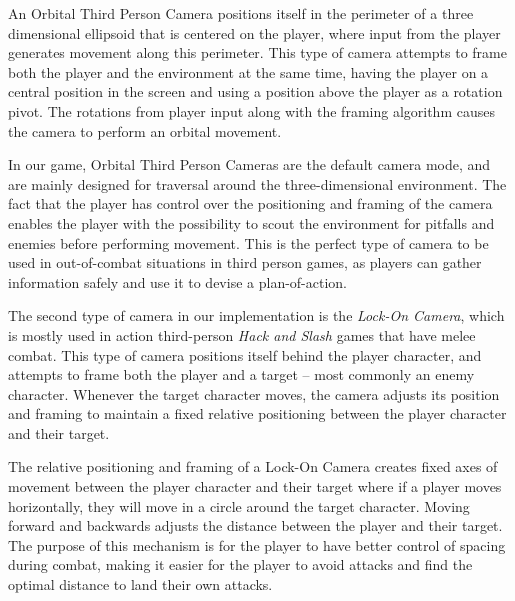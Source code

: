 An Orbital Third Person Camera positions itself in the perimeter of a three dimensional ellipsoid that is centered on the player, where input from the player generates movement along this perimeter. This type of camera attempts to frame both the player and the environment at the same time, having the player on a central position in the screen and using a position above the player as a rotation pivot. The rotations from player input along with the framing algorithm causes the camera to perform an orbital movement.

In our game, Orbital Third Person Cameras are the default camera mode, and are mainly designed for traversal around the three-dimensional environment. The fact that the player has control over the positioning and framing of the camera enables the player with the possibility to scout the environment for pitfalls and enemies before performing movement. This is the perfect type of camera to be used in out-of-combat situations in third person games, as players can gather information safely and use it to devise a plan-of-action.

The second type of camera in our implementation is the \emph{Lock-On Camera}, which is mostly used in action third-person \emph{Hack and Slash} games that have melee combat. This type of camera positions itself behind the player character, and attempts to frame both the player and a target -- most commonly an enemy character. Whenever the target character moves, the camera adjusts its position and framing to maintain a fixed relative positioning between the player character and their target.

The relative positioning and framing of a Lock-On Camera creates fixed axes of movement between the player character and their target where if a player moves horizontally, they will move in a circle around the target character. Moving forward and backwards adjusts the distance between the player and their target. The purpose of this mechanism is for the player to have better control of spacing during combat, making it easier for the player to avoid attacks and find the optimal distance to land their own attacks.


